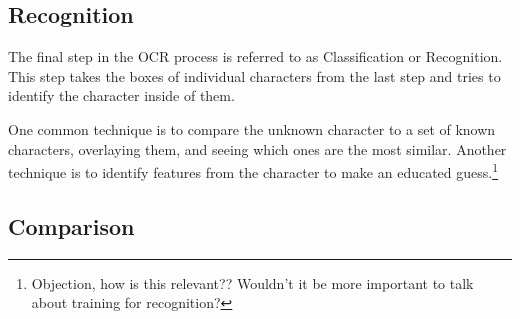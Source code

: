 \documentclass[sigplan,screen,nonacm]{acmart-tagged}
\begin{document}


\subsection{Recognition}
\label{Recognition}

The final step in the OCR process is referred to as Classification or Recognition. This step takes the boxes of individual characters from the last step and tries to identify the character inside of them.

One common technique is to compare the unknown character to a set of known characters, overlaying them, and seeing which ones are the most similar. Another technique is to identify features from the character to make an educated guess.\citep{Thorat:2022}\footnote{Objection, how is this relevant?? Wouldn't it be more important to talk about training for recognition?}

%

\subsection{Comparison}
\label{comparison}
\end{document}
